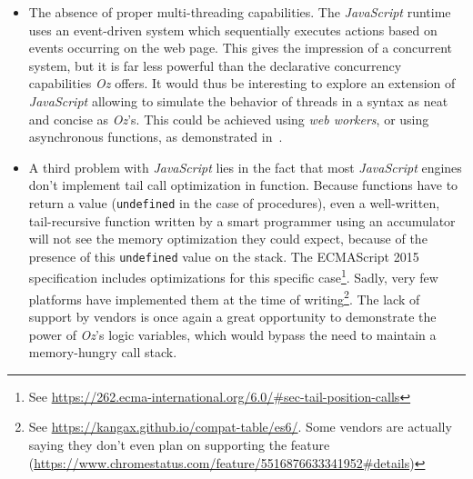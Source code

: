 \begin{itemize}
    This is a nice approach, but it still can be confusing for the programmer, as it isn't very intuitive : if I am not allowed to access the variable, why could I declare it after its access in the first place ?
    \textit{Oz} provides a much more elegant approach, with the concept of \textit{unbound values} (see Figure~\ref{fig:oz-unbound}).
    Any function that needs to access such a value will wait until it is available, which allows creating data-driven operations (\textit{dataflow execution}).
    This is a fundamentally different approach to this problem, but one that is probably worth exploring in an extension of \textit{JavaScript}, notably by using its asynchronous capabilities~\cite{ozjs}.
    \begin{figure}
        \begin{lstlisting}[language=oz]
        local
            A % Equivalent to A = _
        in
            {Browse {PerformComputation 5 1 A}}
            % The function holds until A gets a value
            % A is still unbound
            A = 1 % The function can get evaluated
        end
        \end{lstlisting}
        \caption{Unbound values in \textit{Oz}}
        \label{fig:oz-unbound}
    \end{figure}
    \item The absence of proper multi-threading capabilities.
    The \textit{JavaScript} runtime uses an event-driven system which sequentially executes actions based on events occurring on the web page.
    This gives the impression of a concurrent system, but it is far less powerful than the declarative concurrency capabilities \textit{Oz} offers.
    It would thus be interesting to explore an extension of \textit{JavaScript} allowing to simulate the behavior of threads in a syntax as neat and concise as \textit{Oz}'s.
    This could be achieved using \textit{web workers}, or using asynchronous functions, as demonstrated in~\cite{ozjs}.
    \item A third problem with \textit{JavaScript} lies in the fact that most \textit{JavaScript} engines don't implement tail call optimization in function.
    Because functions have to return a value (\texttt{undefined} in the case of procedures), even a well-written, tail-recursive function written by a smart programmer using an accumulator will not see the memory optimization they could expect, because of the presence of this \texttt{undefined} value on the stack.
    The ECMAScript 2015 specification includes optimizations for this specific case\footnote{See \url{https://262.ecma-international.org/6.0/\#sec-tail-position-calls}}.
    Sadly, very few platforms have implemented them at the time of writing\footnote{See \url{https://kangax.github.io/compat-table/es6/}. Some vendors are actually saying they don't even plan on supporting the feature (\url{https://www.chromestatus.com/feature/5516876633341952\#details})}.
    The lack of support by vendors is once again a great opportunity to demonstrate the power of \textit{Oz}'s logic variables, which would bypass the need to maintain a memory-hungry call stack.
\end{itemize}
